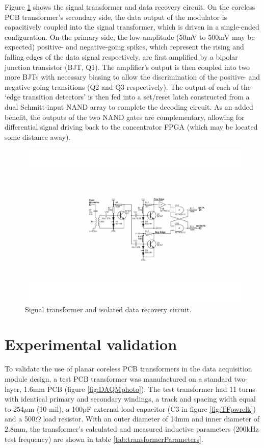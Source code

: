 \documentclass[conference]{IEEEtran}
\begin{document}
	Figure \ref{fig:TFdat} shows the signal transformer and data recovery circuit.  On the coreless PCB transformer's secondary side, the data output of the modulator is capacitively coupled into the signal transformer, which is driven in a single-ended configuration.  On the primary side, the low-amplitude (50mV to 500mV may be expected) positive- and negative-going spikes, which represent the rising and falling edges of the data signal respectively, are first amplified by a bipolar junction transistor (BJT, Q1).  The amplifier's output is then coupled into two more BJTs with necessary biasing to allow the discrimination of the positive- and negative-going transitions (Q2 and Q3 respectively).  The output of each of the `edge transition detectors' is then fed into a set/reset latch constructed from a dual Schmitt-input NAND array to complete the decoding circuit.  As an added benefit, the outputs of the two NAND gates are complementary, allowing for differential signal driving back to the concentrator FPGA (which may be located some distance away).
%
	\begin{figure}[t]
		\centering
		\includegraphics[width=1\columnwidth]{./img/TFdat_BW}
		\caption{Signal transformer and isolated data recovery circuit.}
		\label{fig:TFdat}
	\end{figure}
%	
\section{Experimental validation}
To validate the use of planar coreless PCB transformers in the data acquisition module design, a test PCB transformer was manufactured on a standard two-layer, 1.6mm PCB (figure \ref{fig:DAQMphoto}).  The test transformer had 11 turns with identical primary and secondary windings, a track and spacing width equal to $ 254\mu $m (10 mil), a 100pF external load capacitor (C3 in figure \ref{fig:TFpwrclk}) and a 500$\Omega$ load resistor.  With an outer diameter of 14mm and inner diameter of 2.8mm, the transformer's calculated and measured inductive parameters (200kHz test frequency) are shown in table \ref{tab:transformerParameters}.
\end{document}
